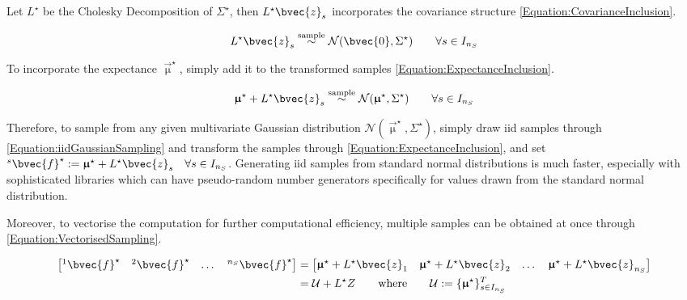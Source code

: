 			Let $L^{\star}$ be the Cholesky Decomposition of $\Sigma^{\star}$, then $L^{\star} \bvec{z}_{s}$ incorporates the covariance structure \eqref{Equation:CovarianceInclusion}.
			
			\begin{equation}
				\begin{aligned}
					L^{\star} \bvec{z}_{s} \stackrel{\text{sample}}{\sim} \mathcal{N}(\bvec{0}, \Sigma^{\star}) \qquad \forall s \in I_{n_{S}}
				\end{aligned}
			\label{Equation:CovarianceInclusion}
			\end{equation}
			
			To incorporate the expectance $\vec{\upmu}^{\star}$, simply add it to the transformed samples \eqref{Equation:ExpectanceInclusion}.
			
			\begin{equation}
				\begin{aligned}
					\vec{\upmu}^{\star} + L^{\star} \bvec{z}_{s} \stackrel{\text{sample}}{\sim} \mathcal{N}(\vec{\upmu}^{\star}, \Sigma^{\star}) \qquad \forall s \in I_{n_{S}}
				\end{aligned}
			\label{Equation:ExpectanceInclusion}
			\end{equation}
			
			Therefore, to sample from any given multivariate Gaussian distribution $\mathcal{N}(\vec{\upmu}^{\star}, \Sigma^{\star})$, simply draw iid samples through \eqref{Equation:iidGaussianSampling} and transform the samples through \eqref{Equation:ExpectanceInclusion}, and set ${^{s}}\bvec{f}^{\star} := \vec{\upmu}^{\star} + L^{\star} \bvec{z}_{s} \quad \forall s \in I_{n_{S}}$. Generating iid samples from standard normal distributions is much faster, especially with sophisticated libraries which can have pseudo-random number generators specifically for values drawn from the standard normal distribution.
			
			Moreover, to vectorise the computation for further computational efficiency, multiple samples can be obtained at once through \eqref{Equation:VectorisedSampling}.
			
			\begin{equation}
				\begin{aligned}
					\begin{bmatrix} {^{1}}\bvec{f}^{\star} & {^{2}}\bvec{f}^{\star} & \dots & {^{n_{S}}}\bvec{f}^{\star} \end{bmatrix} &= \begin{bmatrix} \vec{\upmu}^{\star} + L^{\star} \bvec{z}_{1} & \vec{\upmu}^{\star} + L^{\star} \bvec{z}_{2} & \dots & \vec{\upmu}^{\star} + L^{\star} \bvec{z}_{n_{S}} \end{bmatrix} \\
					&= \mathcal{U} + L^{\star} Z \qquad \text{where} \qquad \mathcal{U} := \{\vec{\upmu}^{\star}\}^{T}_{s \in I_{n_{S}}}
				\end{aligned}
			\label{Equation:VectorisedSampling}
			\end{equation}			
			
